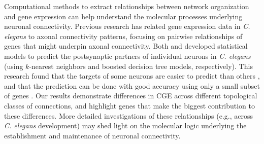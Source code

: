 {Computational methods to extract relationships between network organization and gene expression can help understand the molecular processes underlying neuronal connectivity.
Previous research has related gene expression data in \textit{C. elegans} to axonal connectivity patterns, focusing on pairwise relationships of genes that might underpin axonal connectivity.
Both \citet{Kaufman2006} and \citet{Baruch2008} developed statistical models to predict the postsynaptic partners of individual neurons in \textit{C. elegans} (using $k$-nearest neighbors and boosted decision tree models, respectively).
This research found that the targets of some neurons are easier to predict than others \citep{Kaufman2006}, and that the prediction can be done with good accuracy using only a small subset of genes \citep{Baruch2008}.
Our results demonstrate differences in CGE across different topological classes of connections, and highlight genes that make the biggest contribution to these differences.
More detailed investigations of these relationships (e.g., across \textit{C. elegans} development) may shed light on the molecular logic underlying the establishment and maintenance of neuronal connectivity.

}
